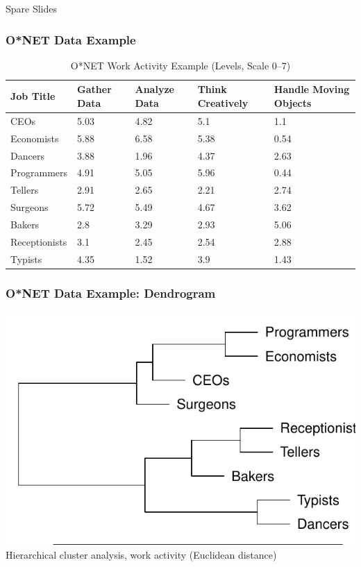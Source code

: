 \documentclass[red]{beamer}
\begin{document}
\begin{frame}
  \begin{center}
    Spare Slides
  \end{center}
\end{frame}

\begin{frame}
\frametitle{O*NET Data Example}
\begin{table}[htbp]
\begin{tabular}{|p{2cm}|p{1.65cm}|p{1.5cm}|p{1.5cm}|p{1.5cm}|}
\hline
{Job Title} & {Gather Data} & {Analyze Data} & {\small Think Creatively} & {Handle Moving Objects} \\ \hline
{CEOs} & 5.03 & 4.82 & 5.1 & 1.1  \\ \hline
{Economists} & 5.88 & 6.58 & 5.38 & 0.54 \\ \hline
{Dancers} & 3.88 & 1.96 & 4.37 & 2.63 \\ \hline
{Programmers} & 4.91 & 5.05 & 5.96 & 0.44 \\ \hline
{Tellers} & 2.91 & 2.65 & 2.21 & 2.74 \\ \hline
{Surgeons} & 5.72 & 5.49 & 4.67 & 3.62 \\ \hline
{Bakers} & 2.8 & 3.29 & 2.93 & 5.06 \\ \hline
{Receptionists} & 3.1 & 2.45 & 2.54 & 2.88 \\ \hline
{Typists} & 4.35 & 1.52 & 3.9 & 1.43 \\ \hline
\end{tabular}
\caption{O*NET Work Activity Example (Levels, Scale 0--7)}
\label{onetex}
\end{table}
\end{frame}

\begin{frame}
  \frametitle{O*NET Data Example: Dendrogram}
  \begin{center}
  \includegraphics[width=\textwidth]{slides_fig/example_cluster.pdf} \\
  Hierarchical cluster analysis, work activity (Euclidean distance)
  \end{center}
\end{frame}
\end{document}
